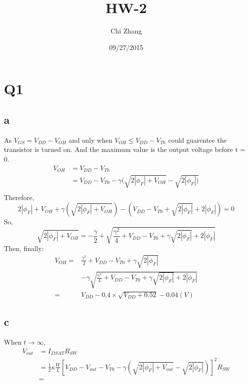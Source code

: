 \documentclass[a4paper,10pt]{article}
\title{HW-2}
\author{Chi Zhang}
\date{09/27/2015}
\begin{document}
\maketitle
\section*{Q1}
\subsection*{a}
As \begin{math}V_{GS} = V_{DD} - V_{OH}\end{math} and only when \begin{math}V_{OH} \leq V_{DD} - V_{Th}\end{math} could 
guarentee the transistor is turned on. And the maximum value is the output voltage before t = 0.
\begin{equation}
\begin{split}
 V_{OH} &= V_{DD} - V_{Th}\\
        &= V_{DD} - V_{T0} - \gamma(\sqrt{2|\phi_F| + V_{OH}} - \sqrt{2|\phi_F|)}\\
\end{split}
\end{equation}
Therefore, 
\begin{equation}
2|\phi_F| + V_{OH} + \gamma(\sqrt{2|\phi_F| + V_{OH}}) - (V_{DD} - V_{T0} + \sqrt{2|\phi_F|} + 2|\phi_F|) = 0
\end{equation}
So,
\begin{equation}
\sqrt{2|\phi_F| + V_{OH}} = -\frac{\gamma}{2} + \sqrt{\frac{\gamma ^2}{4} + V_{DD} - V_{T0} + \gamma\sqrt{2|\phi_F|}
+ 2|\phi_F|}
\end{equation}
Then, finally:
\begin{equation}
\begin{split}
V_{OH} =& \frac{\gamma ^2}{2} + V_{DD} - V_{T0} + \gamma\sqrt{2|\phi_F|} \\
                &-\gamma\sqrt{\frac{\gamma ^2}{4} + V_{DD} - V_{T0} + \gamma\sqrt{2|\phi_F|} + 2|\phi_F|}\\
              =&V_{DD} - 0.4\times\sqrt{V_{DD} + 0.52} - 0.04 (V)
\end{split}
\end{equation}
\subsection*{c}
When \begin{math}t\rightarrow\infty\end{math},
\begin{equation}
\begin{split}
V_{out} &= I_{DSAT}R_{SW}\\
&= \frac{1}{2}\kappa\frac{W}{L}[V_{DD} - V_{out} - V_{T0} - \gamma(\sqrt{2|\phi_F| + V_{out} } - \sqrt{2|\phi_F|})] ^2 R_{SW}\\
&=
\end{split}
\end{equation}
\end{document}
